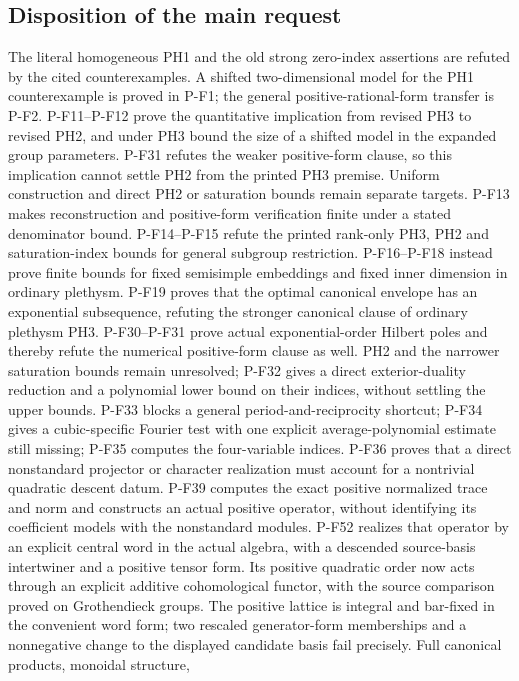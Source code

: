 \documentclass[11pt,a4paper]{article}
\begin{document}
\subsection{Disposition of the main request}
The literal homogeneous PH1 and the old strong zero-index assertions
are refuted by the cited counterexamples. A shifted two-dimensional
model for the PH1 counterexample is proved in P-F1; the general
positive-rational-form transfer is P-F2. P-F11--P-F12 prove the
quantitative implication from revised PH3 to revised PH2, and under
PH3 bound the size of a shifted model in the expanded group parameters.
P-F31 refutes the weaker positive-form clause, so this implication
cannot settle PH2 from the printed PH3 premise. Uniform construction
and direct PH2 or saturation bounds remain separate targets. P-F13 makes reconstruction and positive-form verification
finite under a stated denominator bound. P-F14--P-F15 refute the
printed rank-only PH3, PH2 and saturation-index bounds for general
subgroup restriction. P-F16--P-F18 instead prove finite bounds for
fixed semisimple embeddings and fixed inner dimension in ordinary
plethysm. P-F19 proves that the optimal canonical envelope has an
exponential subsequence, refuting the stronger canonical clause of
ordinary plethysm PH3. P-F30--P-F31 prove actual exponential-order
Hilbert poles and thereby refute the numerical positive-form clause
as well. PH2 and the narrower saturation bounds remain unresolved;
P-F32 gives a direct exterior-duality reduction and a polynomial
lower bound on their indices, without settling the upper bounds.
P-F33 blocks a general period-and-reciprocity shortcut; P-F34 gives
a cubic-specific Fourier test with one explicit average-polynomial
estimate still missing; P-F35 computes the four-variable indices.
P-F36 proves that a direct nonstandard projector or character
realization must account for a nontrivial quadratic descent datum.
P-F39 computes the exact positive normalized trace and norm and
constructs an actual positive operator, without identifying its
coefficient models with the nonstandard modules. P-F52 realizes
that operator by an explicit central word in the actual algebra,
with a descended source-basis intertwiner and a positive tensor
form. Its positive quadratic order now acts through an explicit
additive cohomological functor, with the source comparison proved
on Grothendieck groups. The positive lattice is integral and
bar-fixed in the convenient word form; two rescaled generator-form
memberships and a nonnegative change to the displayed candidate
basis fail precisely. Full canonical products, monoidal structure,
\end{document}
